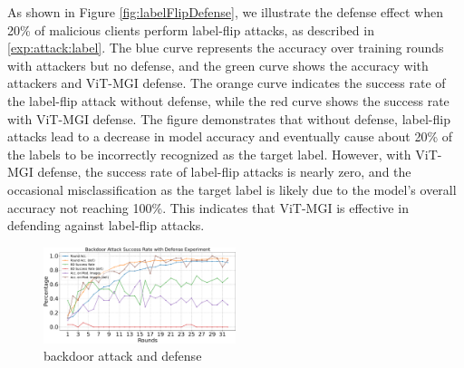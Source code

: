 \documentclass[conference]{IEEEtran}
\def\figBackdoorAttackDefense{0.5\textwidth}
\begin{document}
As shown in Figure \hyperref[fig:labelFlipDefense]{\ref{fig:labelFlipDefense}}, we illustrate the defense effect when 20\% of malicious clients perform label-flip attacks, as described in \hyperref[exp:attack:label]{\ref{exp:attack:label}}. The blue curve represents the accuracy over training rounds with attackers but no defense, and the green curve shows the accuracy with attackers and ViT-MGI defense. The orange curve indicates the success rate of the label-flip attack without defense, while the red curve shows the success rate with ViT-MGI defense. The figure demonstrates that without defense, label-flip attacks lead to a decrease in model accuracy and eventually cause about 20\% of the labels to be incorrectly recognized as the target label. However, with ViT-MGI defense, the success rate of label-flip attacks is nearly zero, and the occasional misclassification as the target label is likely due to the model's overall accuracy not reaching 100\%. This indicates that ViT-MGI is effective in defending against label-flip attacks.

\begin{figure}[htbp]
    \centerline{\includegraphics[width=\figBackdoorAttackDefense]{pics/006-backdoorAttack-WithDefense.pdf}}
    \caption{backdoor attack and defense}
    \label{fig:backdoorAttackDefense}
\end{figure}

\end{document}
